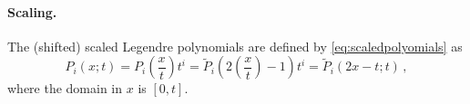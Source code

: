 


\paragraph{Scaling.}
The (shifted) scaled Legendre polynomials are defined by \eqref{eq:scaledpolyomials} as
\begin{equation}
	P_i(x;t) = P_i\left(\frac{x}{t}\right)t^i = \tilde{P}_i\left(2\left(\frac{x}{t}\right)-1\right)t^i = \tilde{P}_i(2x-t;t) \,,
\end{equation}
where the domain in $x$ is $[0,t]$.

